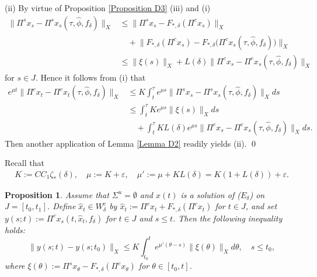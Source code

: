 \documentclass[12pt]{amsart}
\newtheorem{Prop}{Proposition}
\begin{document}
\noindent
(ii) By virtue of Proposition \ref{Proposition D3} (iii) and (i)
\begin{align*}
   \|\Pi^sx_s - \Pi^s x_s(\tau,\hat\phi,f_\delta) \|_X
   &\leq \|\Pi^s x_s-F_{\ast,\delta}(\Pi^c x_s)\|_X \\
   &\quad +\big\|F_{\ast,\delta}(\Pi^c x_s)- F_{\ast,\delta}\big(\Pi^c x_s(\tau,\hat\phi,f_\delta)\big)\big\|_X \\
   &\leq  \|\xi(s)\|_X + L(\delta)\| \Pi^c x_s - \Pi^c x_s(\tau,\hat\phi,f_\delta)\|_X
\end{align*}
for $s\in J$. Hence it follows from (i) that 
\begin{align*}
   e^{\mu t}\|\Pi^cx_t - \Pi^cx_t(\tau,\hat\phi,f_\delta) \|_X
   &\leq K\int_t^{\tau}e^{\mu s}\|\Pi^sx_s-\Pi^sx_s(\tau,\hat{\phi},f_{\delta})\|_Xds \\
   &\leq \int_t^\tau Ke^{\mu s}\|\xi(s)\|_Xds  \\
   &\quad +\int_t^\tau KL(\delta)e^{\mu s}\| \Pi^c x_s - \Pi^c x_s(\tau,\hat\phi,f_\delta)\|_Xds.
\end{align*}
Then another application of Lemma \ref{Lemma D2} readily yields (ii). \qed 

\vskip 5mm

Recall that 
\begin{align}\label{386}
   K:=CC_1\zeta_\ast(\delta), \quad 
   \mu:=K+\varepsilon, \quad 
   \mu':=\mu+KL(\delta)=K(1+L(\delta))+\varepsilon .
\end{align}

\begin{Prop}\label{Proposition D5}
Assume that $\Sigma^u=\emptyset$ and $x(t)$ is a solution of ($E_\delta$) 
on $J=[t_0,t_1]$. Define $\hat x_t\in W^c_\delta$ by 
$\hat x_t:=\Pi^c x_t+ F_{\ast,\delta}(\Pi^c x_t)$ for $t\in J$, and set 
$y(s;t):=\Pi^c x_s(t,\hat x_t,f_\delta)$ for $t\in J$ and $s\leq t$. 
Then the following inequality holds:
$$
   \|y(s;t)-y(s;t_0)\|_X
   \leq K\int_{t_0}^t e^{\mu'(\theta-s)}\|\xi(\theta)\|_Xd\theta, 
        \quad s\leq t_0,
$$
where $\xi(\theta):=\Pi^s x_\theta- F_{\ast,\delta}(\Pi^c x_\theta)$ 
for $\theta \in [t_0,t]$.
\end{Prop}
\end{document}
